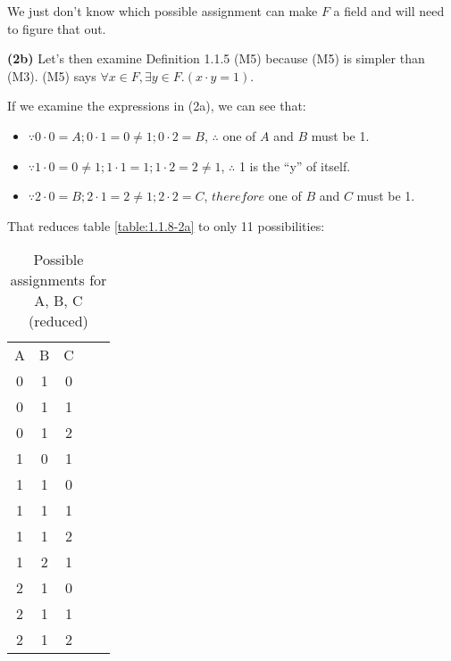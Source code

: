 \documentclass[12pt, letterpaper, oneside]{book}
\begin{document}
We just don't know which possible assignment can make $F$ a field and will need to figure that out.

\textbf{(2b)} Let's then examine Definition 1.1.5 (M5) because (M5) is simpler than (M3). (M5) says $\forall x \in F,
  \exists y \in F. (x \cdot y = 1)$.

If we examine the expressions in (2a), we can see that:
\begin{itemize}
  \item $\because 0 \cdot 0 = A; 0 \cdot 1 = 0 \ne 1; 0 \cdot 2 = B$, $\therefore$ one of $A$ and $B$ must be 1.
  \item $\because 1 \cdot 0 = 0 \ne 1; 1 \cdot 1 = 1; 1 \cdot 2 = 2 \ne 1$, $\therefore$ 1 is the ``y'' of itself.
  \item $\because 2 \cdot 0 = B; 2 \cdot 1 = 2 \ne 1; 2 \cdot 2 = C$, $therefore$ one of $B$ and $C$ must be 1.
\end{itemize}

That reduces table \ref{table:1.1.8-2a} to only 11 possibilities:

\begin{table}[H]
  \centering
  \begin{tabular}{|c|c|c|ll}
    \cline{1-3}
    A & B & C &  & \\ [1ex] \cline{1-3}
    0 & 1 & 0 &  & \\ [0.5ex] \cline{1-3}
    0 & 1 & 1 &  & \\ [0.5ex] \cline{1-3}
    0 & 1 & 2 &  & \\ [0.5ex] \cline{1-3}
    1 & 0 & 1 &  & \\ [0.5ex] \cline{1-3}
    1 & 1 & 0 &  & \\ [0.5ex] \cline{1-3}
    1 & 1 & 1 &  & \\ [0.5ex] \cline{1-3}
    1 & 1 & 2 &  & \\ [0.5ex] \cline{1-3}
    1 & 2 & 1 &  & \\ [0.5ex] \cline{1-3}
    2 & 1 & 0 &  & \\ [0.5ex] \cline{1-3}
    2 & 1 & 1 &  & \\ [0.5ex] \cline{1-3}
    2 & 1 & 2 &  & \\ [0.5ex] \cline{1-3}
  \end{tabular}
  \caption{Possible assignments for A, B, C (reduced)}
  \label{table:1.1.8-2b}
\end{table}
\end{document}

